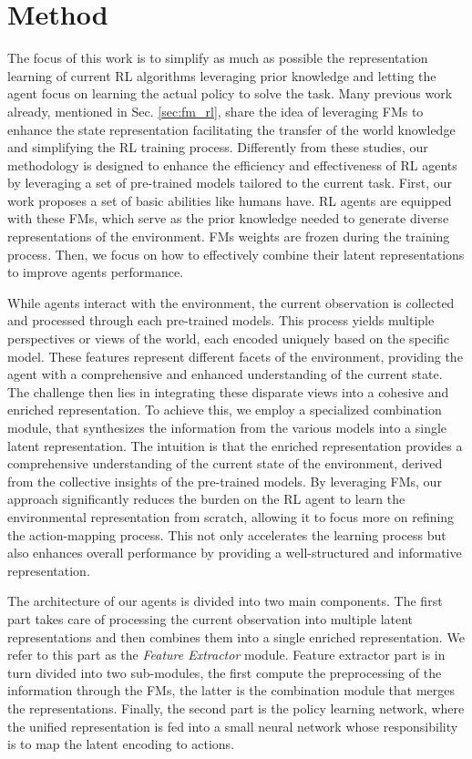 
\chapter{Method}
\label{sec:method}
The focus of this work is to simplify as much as possible the representation learning of current RL algorithms leveraging prior knowledge and letting the agent focus on learning the actual policy to solve the task.
Many previous work already, mentioned in Sec. \ref{sec:fm_rl}, share the idea of leveraging FMs to enhance the state representation facilitating the transfer of the world knowledge and simplifying the RL training process.
Differently from these studies, our methodology is designed to enhance the efficiency and effectiveness of RL agents by leveraging a set of pre-trained models tailored to the current task.
First, our work proposes a set of basic abilities like humans have.
RL agents are equipped with these FMs, which serve as the prior knowledge needed to generate diverse representations of the environment.
FMs weights are frozen during the training process.
Then, we focus on how to effectively combine their latent representations to improve agents performance.

While agents interact with the environment, the current observation is collected and processed through each pre-trained models.
This process yields multiple perspectives or views of the world, each encoded uniquely based on the specific model.
These features represent different facets of the environment, providing the agent with a comprehensive and enhanced understanding of the current state.
The challenge then lies in integrating these disparate views into a cohesive and enriched representation.
To achieve this, we employ a specialized combination module, that synthesizes the information from the various models into a single latent representation.
The intuition is that the enriched representation provides a comprehensive understanding of the current state of the environment, derived from the collective insights of the pre-trained models.
By leveraging FMs, our approach significantly reduces the burden on the RL agent to learn the environmental representation from scratch, allowing it to focus more on refining the action-mapping process.
This not only accelerates the learning process but also enhances overall performance by providing a well-structured and informative representation.

The architecture of our agents is divided into two main components.
The first part takes care of processing the current observation into multiple latent representations and then combines them into a single enriched representation.
We refer to this part as the \textit{Feature Extractor} module.
Feature extractor part is in turn divided into two sub-modules, the first compute the preprocessing of the information through the FMs, the latter is the combination module that merges the representations.
Finally, the second part is the policy learning network, where the unified representation is fed into a small neural network whose responsibility is to map the latent encoding to actions.

